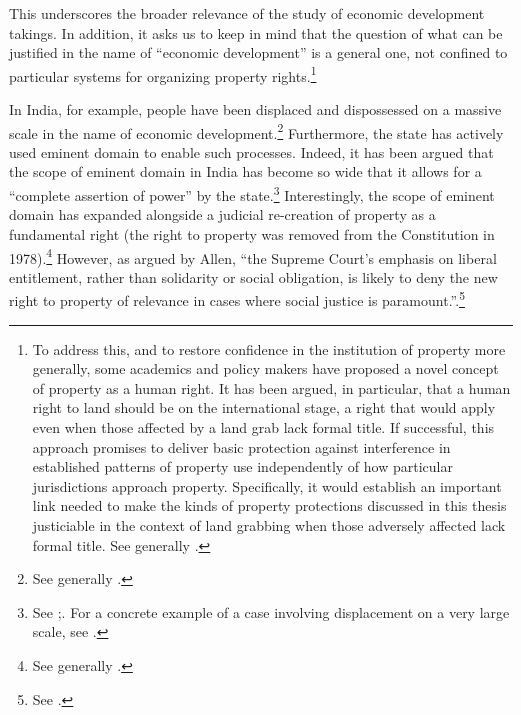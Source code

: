 This underscores the broader relevance of the study of economic development takings. In addition, it asks us to keep in mind that the question of what can be justified in the name of ``economic development'' is a general one, not confined to particular systems for organizing property rights.\footnote{To address this, and to restore confidence in the institution of property more generally, some academics and policy makers have proposed a novel concept of property as a human right. It has been argued, in particular, that a human right to land should be  on the international stage, a right that would apply even when those affected by a land grab lack formal title. If successful, this approach promises to deliver basic protection against interference in established patterns of property use independently of how particular jurisdictions approach property. Specifically, it would establish an important link needed to make the kinds of property protections discussed in this thesis justiciable in the context of land grabbing when those adversely affected lack formal title. See generally \cite{schutter10,schutter11,kunnerman13}.}

In India, for example, people have been displaced and dispossessed on a massive scale in the name of economic development.\footnote{See generally \cite{levien13}.} Furthermore, the state has actively used eminent domain to enable such processes. Indeed, it has been argued that the scope of eminent domain in India has become so wide that it allows for a ``complete assertion of power'' by the state.\footnote{See \cite[43]{cullet09};\cite{usha09}. For a concrete example of a case involving displacement on a very large scale, see \cite{cullet01}.} Interestingly, the scope of eminent domain has expanded alongside a judicial re-creation of property as a fundamental right (the right to property was removed from the Constitution in 1978).\footnote{See generally \cite{allen15}.} However, as argued by Allen, ``the Supreme Court’s emphasis on liberal entitlement, rather than solidarity or social obligation, is likely to deny the new right to property of relevance in cases where social justice is paramount.''.\footnote{See \cite[30]{allen15}.}


